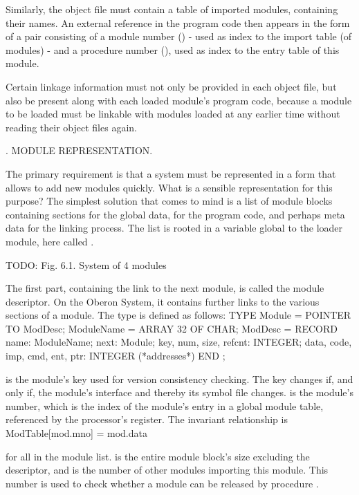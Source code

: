 Similarly, the object file must contain a table of imported modules, containing their names. An external reference in the program code then appears in the form of a pair consisting of a module number () - used as index to the import table (of modules) - and a procedure number (), used as index to the entry table of this module.

Certain linkage information must not only be provided in each object file, but also be present along with each loaded module's program code, because a module to be loaded must be linkable with modules loaded at any earlier time without reading their object files again.

. MODULE REPRESENTATION.

The primary requirement is that a system must be represented in a form that allows to add new modules quickly. What is a sensible representation for this purpose? The simplest solution that comes to mind is a list of module blocks containing sections for the global data, for the program code, and perhaps meta data for the linking process. The list is rooted in a variable global to the loader module, here called .

TODO: Fig. 6.1. System of 4 modules

The first part, containing the link to the next module, is called the module descriptor. On the Oberon System, it contains further links to the various sections of a module. The type  is defined as follows:
\begintt
TYPE Module = POINTER TO ModDesc;
ModuleName = ARRAY 32 OF CHAR;
ModDesc = RECORD
  name: ModuleName;
  next: Module;
  key, num, size, refcnt: INTEGER;
  data, code, imp, cmd, ent, ptr: INTEGER (*addresses*)
END ;
\endtt

\noindent {} is the module's key used for version consistency checking. The key changes if, and only if, the module's interface and thereby its symbol file changes.  is the module's number, which is the index of the module's entry in a global module table, referenced by the processor's  register. The invariant relationship is
\begintt
ModTable[mod.mno] = mod.data
\endtt

\noindent for all  in the module list.  is the entire module block's size excluding the descriptor, and  is the number of other modules importing this module. This number is used to check whether a module can be released by procedure .

